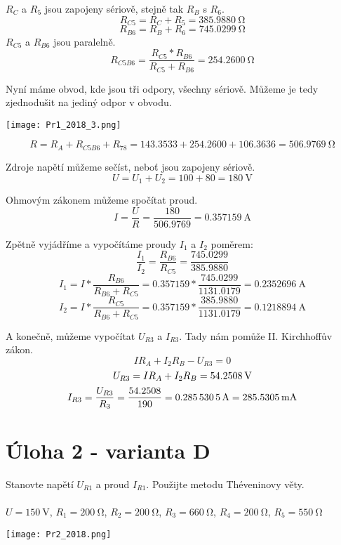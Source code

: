 \documentclass[11pt]{article}
\begin{document}
\(R_C\) a \(R_5\) jsou zapojeny sériově, stejně tak \(R_B\) s \(R_6\).
\[R_{C5} = R_C + R_5 = \SI{385.9880}{\ohm} \]
\[R_{B6} = R_B + R_6 = \SI{745.0299}{\ohm} \]
\(R_{C5}\) a \(R_{B6}\) jsou paralelně.
\[R_{C5B6} = \frac{R_{C5} * R_{B6}}{R_{C5} + R_{B6}} = \SI{254.2600}{\ohm} \]

Nyní máme obvod, kde jsou tři odpory, všechny sériově. Můžeme je tedy zjednodušit na jediný odpor v obvodu.

\begin{center}
	\texttt{[image: Pr1\_2018\_3.png]} 
\end{center}

\[R = R_A + R_{C5B6} + R_{78} = 143.3533 + 254.2600 + 106.3636 = \SI{506.9769}{\ohm} \]

Zdroje napětí můžeme sečíst, neboť jsou zapojeny sériově.
\[U = U_1 + U_2 = 100 + 80 = \SI{180}{\volt} \]

Ohmovým zákonem můžeme spočítat proud.
\[I = \frac{U}{R} = \frac{180}{506.9769} = \SI{0.357159}{\ampere} \]

Zpětně vyjádříme a vypočítáme proudy \(I_1\) a \(I_2\) poměrem:
\[\frac{I_1}{I_2} = \frac{R_{B6}}{R_{C5}} = \frac{745.0299}{385.9880}\]
\[I_1 = I * \frac{R_{B6}}{R_{B6} + R_{C5}} = 0.357159 * \frac{745.0299}{1131.0179} = \SI{0.2352696}{\ampere} \]
\[I_2 = I * \frac{R_{C5}}{R_{B6} + R_{C5}} = 0.357159 * \frac{385.9880}{1131.0179} = \SI{0.1218894}{\ampere} \]

A konečně, můžeme vypočítat \(U_{R3}\) a \(I_{R3}\). Tady nám pomůže II. Kirchhoffův zákon.
\[I R_A + I_2 R_B - U_{R3} = 0 \]
\[U_{R3} = I R_A + I_2 R_B = \textbf{\SI{54.2508}{\volt}} \]
\[I_{R3} = \frac{U_{R3}}{R_3} = \frac{54.2508}{190} = \SI{0.2855305}{\ampere} = \textbf{\SI{285.5305}{\milli\ampere}} \]

\newpage

\section{Úloha 2 - varianta D}
Stanovte napětí \(U_{R1}\) a proud \(I_{R1}\). Použijte metodu Théveninovy věty.
\\
\\
\(U = \SI{150}{\volt}\),
\(R_1 = \SI{200}{\ohm}\),
\(R_2 = \SI{200}{\ohm}\),
\(R_3 = \SI{660}{\ohm}\),
\(R_4 = \SI{200}{\ohm}\),
\(R_5 = \SI{550}{\ohm}\)

\begin{center}
	\texttt{[image: Pr2\_2018.png]} 
\end{center}
\end{document}
